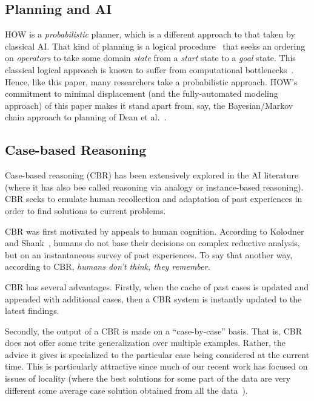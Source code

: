 \documentclass[conference]{IEEEtran}
\begin{document}
\subsection{Planning and AI}
HOW is a {\em probabilistic} planner, which is a different approach to that taken by
classical AI. 
That kind of planning is a logical procedure~\cite{Fikes1971}
that seeks an ordering on {\em operators} to take some domain
{\em state} from a {\em start} state to a {\em goal} state.
This classical logical approach is known to suffer from
computational bottlenecks~\cite{Bylander1994}. Hence,
like this paper,
many researchers take a probabilistic approach.
HOW's commitment to minimal displacement (and the fully-automated
modeling approach) of this paper makes it stand apart from, say,
  the Bayesian/Markov chain approach to planning of Dean et al.~\cite{dean1995planning}.

\subsection{Case-based Reasoning}
Case-based reasoning (CBR) has been extensively
explored in the AI literature
(where it has also bee called
 reasoning via analogy or instance-based reasoning).
CBR seeks to emulate human recollection and adaptation
of past experiences in order to find solutions to current
problems. 

CBR was first motivated by appeals to human cognition. According to 
Kolodner~\cite{Kolodner1992} and Shank~\cite{Schank1977},
humans do not base their decisions
on complex reductive analysis, but on an instantaneous survey of past experiences.
To say that   another way, according  to  CBR, 
{\em humans  don’t
think,  they remember.}



CBR has several advantages.
Firstly,
when the  cache of past cases is  updated and appended with additional cases, then a CBR system is instantly updated
to the latest findings.  

Secondly, the output of a CBR is made on a ``case-by-case'' basis. 
That is, CBR does not offer some trite generalization over multiple
examples. Rather, the advice it gives is specialized to the particular
case being considered at the current time.  This is particularly attractive
since much of our recent work has focused on issues
of locality (where the best solutions for some part of the data
are very different some average case solution obtained from all the data~\cite{localvsglobal}).  
\end{document}
